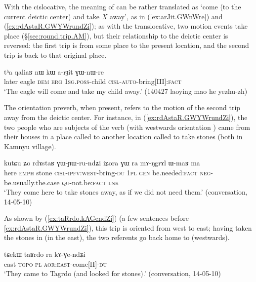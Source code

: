 With the cislocative, the meaning of  can be rather translated as `come (to the current deictic center) and take $X$ away', as in (\ref{ex:arJit.GWnWre}) and (\ref{ex:rdAstaR.GWYWrundZi}); as with the translocative, two motion events take place (§\ref{sec:round.trip.AM}), but their relationship to the deictic center is reversed: the first trip is from some place to the present location, and the second trip is back to that original place.

\begin{exe}
\ex \label{ex:arJit.GWnWre}
\gll  tʰa qaliaʁ nɯ kɯ a-rɟit ɣɯ-nɯ-re \\
later eagle \textsc{dem} \textsc{erg} \textsc{1sg}.\textsc{poss}-child \textsc{cisl}-\textsc{auto}-bring[III]:\textsc{fact} \\
\glt `The eagle will come and take my child away.' (140427 laoying mao he yezhu-zh)
\end{exe}

The orientation preverb, when present, refers to the motion of the second trip away from the deictic center. For instance, in (\ref{ex:rdAstaR.GWYWrundZi}), the two people who are subjects of the verb  (with westwards orientation ) came from their houses in a place called  to another location called  to take stones (both in Kamnyu village).

\begin{exe}
\ex \label{ex:rdAstaR.GWYWrundZi}
\gll  kutɕu ʑo rdɤstaʁ ɣɯ-ɲɯ-ru-ndʑi iʑora ɣɯ ra mɤ-ŋgrɤl ɯ-maʁ ma  \\
here \textsc{emph} stone \textsc{cisl}-\textsc{ipfv}:\textsc{west}-bring-\textsc{du} \textsc{1pl} \textsc{gen} be.needed:\textsc{fact} \textsc{neg}-be.usually.the.case \textsc{qu}-not.be:\textsc{fact} \textsc{lnk} \\
\glt `They come here to take stones away, as if we did not need them.' (conversation, 14-05-10)
\end{exe}

As shown by (\ref{ex:taRrdo.kAGendZi}) (a few sentences before \ref{ex:rdAstaR.GWYWrundZi}), this trip is oriented from west to east; having taken the stones in  (in the east), the two referents go back home to  (westwards).

\begin{exe}
\ex \label{ex:taRrdo.kAGendZi}
\gll  tɕekɯ taʁrdo ra kɤ-ɣe-ndʑi \\
east  \textsc{topo} \textsc{pl} \textsc{aor}:\textsc{east}-come[II]-\textsc{du} \\
\glt `They came to Tagrdo (and looked for stones).' (conversation, 14-05-10)
\end{exe}


